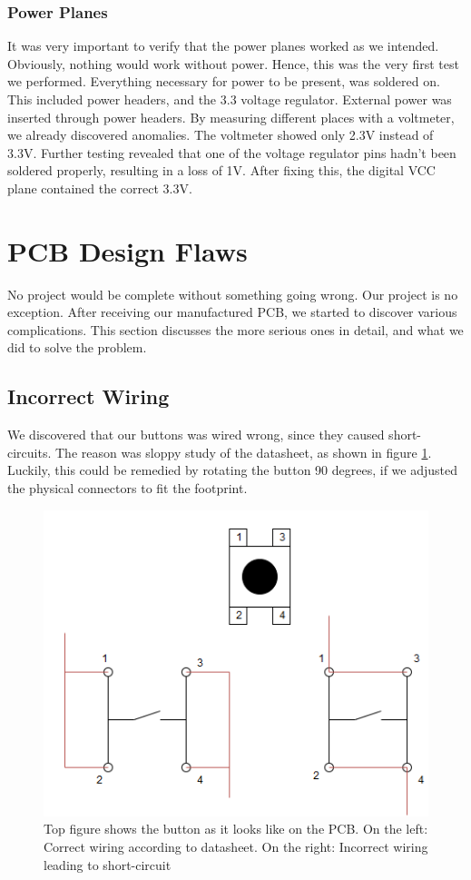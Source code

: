 \begin{itemize}
\subsubsection{Power Planes}
It was very important to verify that the power planes worked as we intended. Obviously, nothing would work without power. Hence, this was the very first test we performed.
\newline
Everything necessary for power to be present, was soldered on. This included power headers, and the 3.3 voltage regulator. External power was inserted through power headers. By measuring different places with a voltmeter, we already discovered anomalies. The voltmeter showed only 2.3V instead of 3.3V. Further testing revealed that one of the voltage regulator pins hadn't been soldered properly, resulting in a loss of 1V. After fixing this, the digital VCC plane contained the correct 3.3V.


\section{PCB Design Flaws}
No project would be complete without something going wrong. Our project is no exception. After receiving our manufactured PCB, we started to discover various complications. This section discusses the more serious ones in detail, and what we did to solve the problem.

\subsection{Incorrect Wiring}
We discovered that our buttons was wired wrong, since they caused short-circuits. The reason was sloppy study of the datasheet, as shown in figure \ref{fig:Button Issue}. Luckily, this could be remedied by rotating the button 90 degrees, if we adjusted the physical connectors to fit the footprint.

\begin{figure}[h!]
\centering
\includegraphics[scale=0.5]{images/Button_Issue.png}
\caption{Top figure shows the button as it looks like on the PCB. On the left: Correct wiring according to datasheet. On the right: Incorrect wiring leading to short-circuit}
\label{fig:Button Issue}
\end{figure}


\end{itemize}
